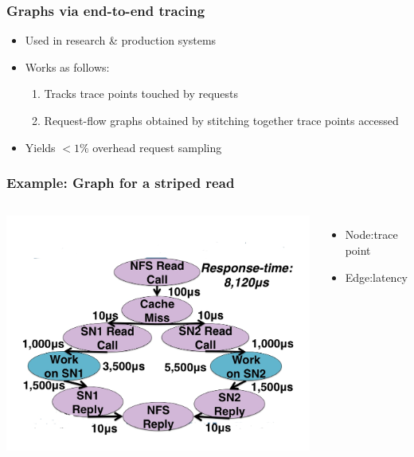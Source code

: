 \documentclass[11pt]{beamer}
\begin{document}
\begin{frame}
\frametitle{Graphs via end-to-end tracing}
\begin{itemize}
  \item Used in research \& production systems
  \item Works as follows:
  \begin{enumerate}
    \item Tracks trace points touched by requests
    \item Request-flow graphs obtained by stitching together trace points accessed
  \end{enumerate}
  \item Yields $<1\%$ overhead request sampling
\end{itemize}
\end{frame}

\begin{frame}
\frametitle{Example: Graph for a striped read}
\begin{columns}
\includegraphics[width=\textwidth,height=.9\textheight]{fig/end-to-end.jpg}
\begin{itemize}
  \item Node:trace point
  \item Edge:latency
\end{itemize}
\end{columns}
\end{frame}
\end{document}
